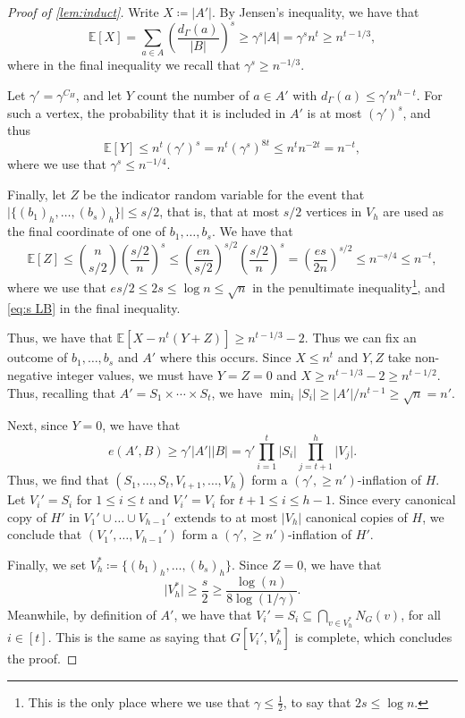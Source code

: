 \documentclass{aic}
\theoremstyle{plain}
\theoremstyle{remark}
\def\E{\mathbb{E}}
\newcommand\ab[1]{\lvert #1 \rvert}
\begin{document}
\begin{proof}[Proof of \cref{lem:induct}]
Write $X\coloneqq\ab{A'}$. By Jensen's inequality, we have that 
\[
\E[X] = \sum_{a\in A}\left(\frac{d_\Gamma(a)}{\ab B}\right)^s \ge \gamma^s \ab A = \gamma^s n^t\ge n^{t-1/3},
\]
where in the final inequality we recall that $\gamma^s \geq n^{-1/3}$.

Let $\gamma'=\gamma^{C_H}$, and let $Y$ count the number of $a\in A'$ with $d_\Gamma(a)\le \gamma' n^{h-t}$. For such a vertex, the probability that it is included in $A'$ is at most $(\gamma')^s$, and thus 
\[\E[Y]\le n^t(\gamma')^{s}=n^t (\gamma^s)^{8t} \leq n^t n^{-2t} = n^{-t},\]
where we use that $\gamma^s \leq n^{-1/4}$.

Finally, let $Z$ be the indicator random variable for the event that $\ab{\{(b_1)_h,\dots,(b_s)_h\}}\leq s/2$, that is, that at most $s/2$ vertices in $V_h$ are used as the final coordinate of one of $b_1,\dots,b_s$. We have that 
\[
\E[Z] \leq \binom{n}{s/2} \left(\frac{s/2}{n}\right)^s \leq \left(\frac{en}{s/2}\right)^{s/2} \left(\frac{s/2}{n}\right)^s = \left(\frac{es}{2n}\right)^{s/2} \leq n^{-s/4} \leq n^{-t},
\]
where we use that $es/2 \leq 2s \leq \log n \leq \sqrt n$ in the penultimate inequality\footnote{This is the only place where we use that $\gamma \leq \frac 12$, to say that $2s \leq \log n$.}, and \eqref{eq:s LB} in the final inequality.

Thus, we have that $\E[X-n^t(Y+Z)]\geq n^{t-1/3}-2$. Thus we can fix an outcome of $b_1,\dots,b_s$ and $A'$ where this occurs. Since $X\le n^t$ and $Y,Z$ take non-negative integer values, we must have $Y=Z =0$ and $X\ge n^{t-1/3}-2 \geq n^{t-1/2}$. Thus, recalling that $A' = S_1\times \dotsb \times S_t$, we have $\min_i\ab{S_i} \ge |A'|/n^{t-1} \ge \sqrt{n}=n'$. 

Next, since $Y=0$, we have that $$e(A',B)\ge \gamma'|A'||B| = \gamma' \prod_{i=1}^t\ab{S_i} \prod_{j=t+1}^{h}\ab{V_j}.$$ 
Thus, we find that $(S_1,\dots,S_t,V_{t+1},\dots,V_h)$ form a $(\gamma',\geq n')$-inflation of $H$. Let $V_i' = S_i$ for $1 \leq i \leq t$ and $V_i' = V_i$ for $t+1 \leq i \leq h-1$.
Since every canonical copy of $H'$ in $V_1' \cup \dots \cup V_{h-1}'$ extends to at most $\ab{V_h}$ canonical copies of $H$, we conclude that $(V_1',\dots,V_{h-1}')$ form a $(\gamma', \geq n')$-inflation of $H'$.


Finally, we set $V_h^*\coloneqq  \{(b_1)_h,\dots,(b_s)_h\}$. Since $Z =0$, we have that  
\[
\ab{V_h^*} \geq \frac{s}{2} \geq \frac{\log(n)}{8\log(1/\gamma)}.
\]
Meanwhile, by definition of $A'$, we have that $V_i'= S_i \subseteq \bigcap_{v\in V_h^*}N_G(v)$, for all $i \in [t]$. This is the same as saying that $G[V_i', V_h^*]$ is complete, which concludes the proof.    
\end{proof}
\end{document}
